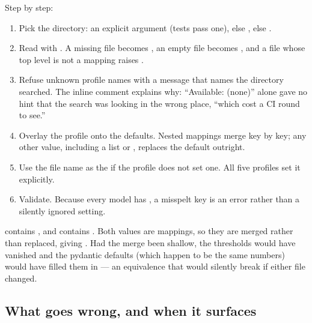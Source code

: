 Step by step:
\begin{enumerate}
  \item Pick the directory: an explicit argument (tests pass one), else , else .
  \item Read  with . A missing file becomes \code{{}}, an empty file becomes \code{{}}, and a file whose top level is not a mapping raises  .
  \item Refuse unknown profile names with a message that names the directory searched. The inline comment explains why: \enquote{Available: (none)} alone gave no hint that the search was looking in the wrong place, \enquote{which cost a CI round to see.}
  \item Overlay the profile onto the defaults. Nested mappings merge key by key; any other value, including a list or , replaces the default outright.
  \item Use the file name as the  if the profile does not set one. All five profiles set it explicitly.
  \item Validate. Because every model has , a misspelt key is an error rather than a silently ignored setting.
\end{enumerate}

\begin{example}
 contains , and  contains . Both values are mappings, so they are merged rather than replaced, giving . Had the merge been shallow, the thresholds would have vanished and the pydantic defaults (which happen to be the same numbers) would have filled them in --- an equivalence that would silently break if either file changed.
\end{example}

\subsection{What goes wrong, and when it surfaces}

